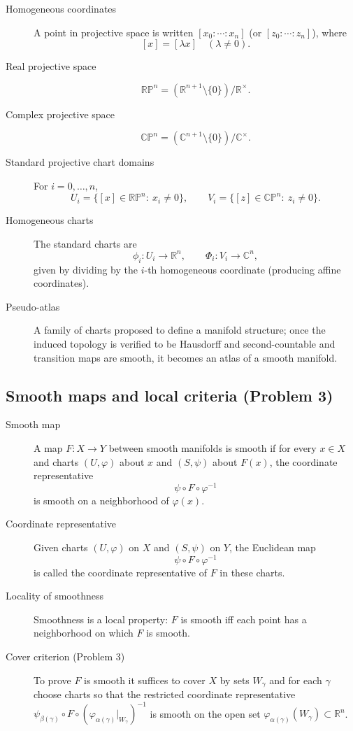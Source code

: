 \documentclass[12pt,a4paper]{article}
\theoremstyle{plain}
\theoremstyle{definition}      %
\begin{document}
\begin{description}
	\item[Homogeneous coordinates]
	A point in projective space is written $[x_0:\cdots:x_n]$ (or $[z_0:\cdots:z_n]$), where
	\[
	[x]=[\lambda x]\quad (\lambda\neq 0).
	\]
	
	\item[Real projective space]
	\[
	\mathbb{RP}^n=(\mathbb R^{n+1}\setminus\{0\})/\mathbb R^\times.
	\]
	
	\item[Complex projective space]
	\[
	\mathbb{CP}^n=(\mathbb C^{n+1}\setminus\{0\})/\mathbb C^\times.
	\]
	
	\item[Standard projective chart domains]
	For $i=0,\dots,n$,
	\[
	U_i=\{[x]\in\mathbb{RP}^n:\ x_i\neq 0\},
	\qquad
	V_i=\{[z]\in\mathbb{CP}^n:\ z_i\neq 0\}.
	\]
	
	\item[Homogeneous charts]
	The standard charts are
	\[
	\phi_i:U_i\to\mathbb R^n,\qquad
	\Phi_i:V_i\to\mathbb C^n,
	\]
	given by dividing by the $i$-th homogeneous coordinate (producing affine coordinates).
	
	\item[Pseudo-atlas]
	A family of charts proposed to define a manifold structure; once the induced topology is verified to be Hausdorff and second-countable
	and transition maps are smooth, it becomes an atlas of a smooth manifold.
\end{description}

\subsection*{Smooth maps and local criteria (Problem 3)}

\begin{description}
	\item[Smooth map]
	A map $F:X\to Y$ between smooth manifolds is smooth if for every $x\in X$ and charts $(U,\varphi)$ about $x$ and $(S,\psi)$ about $F(x)$,
	the coordinate representative
	\[
	\psi\circ F\circ\varphi^{-1}
	\]
	is smooth on a neighborhood of $\varphi(x)$.
	
	\item[Coordinate representative]
	Given charts $(U,\varphi)$ on $X$ and $(S,\psi)$ on $Y$, the Euclidean map
	\[
	\psi\circ F\circ\varphi^{-1}
	\]
	is called the coordinate representative of $F$ in these charts.
	
	\item[Locality of smoothness]
	Smoothness is a local property: $F$ is smooth iff each point has a neighborhood on which $F$ is smooth.
	
	\item[Cover criterion (Problem 3)]
	To prove $F$ is smooth it suffices to cover $X$ by sets $W_\gamma$ and for each $\gamma$ choose charts
	so that the restricted coordinate representative
	$\psi_{\beta(\gamma)}\circ F\circ(\varphi_{\alpha(\gamma)}|_{W_\gamma})^{-1}$
	is smooth on the open set $\varphi_{\alpha(\gamma)}(W_\gamma)\subset\mathbb R^n$.
\end{description}
\end{document}
